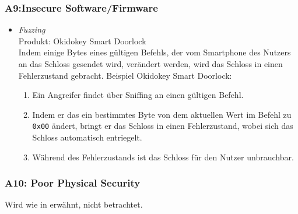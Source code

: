     \subsubsection*{A9:Insecure Software/Firmware}
        \begin{itemize}[leftmargin=0cm,label={}]
            \item \emph{Fuzzing}\cite{Rose2016}\label{vuln:fuzzing}\\
                Produkt: Okidokey Smart Doorlock\\
                Indem einige Bytes eines gültigen Befehls, der vom Smartphone des Nutzers an das Schloss gesendet wird, verändert werden, wird das Schloss in einen Fehlerzustand gebracht. 
    	        Beispiel Okidokey Smart Doorlock:
    	        \begin{enumerate}[noitemsep]
    	            \item Ein Angreifer findet über Sniffing an einen gültigen Befehl.
    	            \item Indem er das ein bestimmtes Byte von dem aktuellen Wert im Befehl zu \colorbox{light-gray}{\lstinline{0x00}} ändert, bringt er das Schloss in einen Fehlerzustand, wobei sich das Schloss automatisch entriegelt.
    	            \item Während des Fehlerzustands ist das Schloss für den Nutzer unbrauchbar.
    	        \end{enumerate} 
        \end{itemize}
        
    \subsubsection*{A10: Poor Physical Security}
        Wird wie in  erwähnt, nicht betrachtet.
    